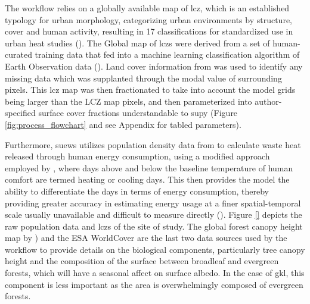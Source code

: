 The workflow relies on a globally available map of \Gls{lcz}, which is an established typology for urban morphology, categorizing urban environments by structure, cover and human activity, resulting in 17 classifications for standardized use in urban heat studies (\cite{lcz}). The Global map of \Gls{lcz}s were derived from a set of human-curated training data that fed into a machine learning classification algorithm of Earth Observation data (\cite{lcz_map}). Land cover information from \textcite{copernicus_lc} was used to identify any missing data which was supplanted through the modal value of surrounding pixels. This \Gls{lcz} map was then fractionated to take into account the model grids being larger than the LCZ map pixels, and then parameterized into author-specified surface cover fractions understandable to \Gls{supy} (Figure \ref{fig:process_flowchart} and see Appendix for tabled parameters). 

Furthermore, \Gls{suews} utilizes population density data from \textcite{popden} to calculate waste heat released through human energy consumption, using a modified approach employed by \textcite{anthropogenic_heat}, where days above and below the baseline temperature of human comfort are termed heating or cooling days. This then provides the model the ability to differentiate the days in terms of energy consumption, thereby providing greater accuracy in estimating energy usage at a finer spatial-temporal scale usually unavailable and difficult to measure directly (\cite{suews}). Figure \ref{} depicts the raw population data and \Gls{lcz}s of the site of study.  The global forest canopy height map by \textcite{forestcanopyheight}) and the ESA WorldCover \textcite{esa_worldcover} are the last two data sources used by the workflow to provide details on the biological components, particularly tree canopy height and the composition of the surface between broadleaf and evergreen forests, which will have a seasonal affect on surface albedo. In the case of \Gls{gkl}, this component is less important as the area is overwhelmingly composed of evergreen forests. 




